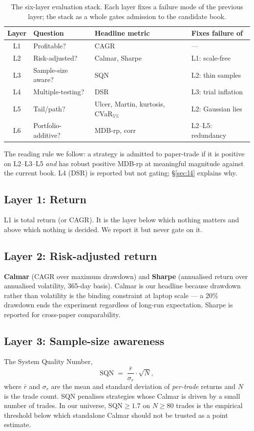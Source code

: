 \documentclass[11pt]{article}
\begin{document}
\begin{table}[h]
\centering
\small
\begin{tabular}{cllp{5cm}}
\toprule
Layer & Question & Headline metric & Fixes failure of \\
\midrule
L1 & Profitable? & CAGR & --- \\
L2 & Risk-adjusted? & Calmar, Sharpe & L1: scale-free \\
L3 & Sample-size aware? & SQN & L2: thin samples \\
L4 & Multiple-testing? & DSR & L3: trial inflation \\
L5 & Tail/path? & Ulcer, Martin, kurtosis, CVaR$_{5\%}$ & L2: Gaussian lies \\
L6 & Portfolio-additive? & MDB-rp, corr & L2--L5: redundancy \\
\bottomrule
\end{tabular}
\caption{The six-layer evaluation stack. Each layer fixes a failure mode of
the previous layer; the stack as a whole gates admission to the candidate
book.}
\label{tab:layers}
\end{table}

The reading rule we follow: a strategy is admitted to paper-trade if it is
positive on L2--L3--L5 \emph{and} has robust positive MDB-rp at meaningful
magnitude against the current book. L4 (DSR) is reported but not gating;
\S\ref{sec:l4} explains why.

\subsection{Layer 1: Return}
L1 is total return (or CAGR). It is the layer below which nothing matters and
above which nothing is decided. We report it but never gate on it.

\subsection{Layer 2: Risk-adjusted return}
\label{sec:l2}
\textbf{Calmar} (CAGR over maximum drawdown) and \textbf{Sharpe} (annualised
return over annualised volatility, 365-day basis). Calmar is our headline
because drawdown rather than volatility is the binding constraint at laptop
scale --- a 20\% drawdown ends the experiment regardless of long-run
expectation. Sharpe is reported for cross-paper comparability.

\subsection{Layer 3: Sample-size awareness}
\label{sec:l3}
The System Quality Number,
\begin{equation}
\mathrm{SQN} \;=\; \frac{\bar{r}}{\sigma_r} \cdot \sqrt{N},
\end{equation}
where $\bar{r}$ and $\sigma_r$ are the mean and standard deviation of
\emph{per-trade} returns and $N$ is the trade count. SQN penalises strategies
whose Calmar is driven by a small number of trades. In our universe,
$\mathrm{SQN} \geq 1.7$ on $N \geq 80$ trades is the empirical threshold below
which standalone Calmar should not be trusted as a point estimate.
\end{document}
